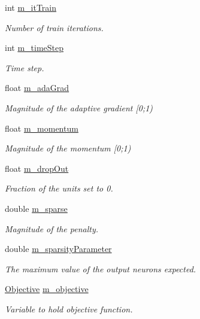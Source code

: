 \begin{DoxyCompactItemize}
int \hyperlink{classNeuralNetwork_a25ea37c7b768bf2ade89c55b9e159ee2}{m\+\_\+it\+Train}
\begin{DoxyCompactList}\small\item\em Number of train iterations. \end{DoxyCompactList}\item 
int \hyperlink{classNeuralNetwork_aea6b9756c3ef7e82b2d40414beb37984}{m\+\_\+time\+Step}
\begin{DoxyCompactList}\small\item\em Time step. \end{DoxyCompactList}\item 
float \hyperlink{classNeuralNetwork_a30141464584fc2cc51599ffec4ce8dd8}{m\+\_\+ada\+Grad}
\begin{DoxyCompactList}\small\item\em Magnitude of the adaptive gradient \mbox{[}0;1) \end{DoxyCompactList}\item 
float \hyperlink{classNeuralNetwork_a8940dc6859b38907717cfec54e0929b1}{m\+\_\+momentum}
\begin{DoxyCompactList}\small\item\em Magnitude of the momentum \mbox{[}0;1) \end{DoxyCompactList}\item 
float \hyperlink{classNeuralNetwork_a754d963a6f58aee1e253f64d266ab487}{m\+\_\+drop\+Out}
\begin{DoxyCompactList}\small\item\em Fraction of the units set to 0. \end{DoxyCompactList}\item 
double \hyperlink{classNeuralNetwork_a5ff4dd9b7b90474cce090c37d7127366}{m\+\_\+sparse}
\begin{DoxyCompactList}\small\item\em Magnitude of the penalty. \end{DoxyCompactList}\item 
double \hyperlink{classNeuralNetwork_ac6e586b8ab49ef7ca1f07dab6f197f6c}{m\+\_\+sparsity\+Parameter}
\begin{DoxyCompactList}\small\item\em The maximum value of the output neurons expected. \end{DoxyCompactList}\item 
\hyperlink{classObjective}{Objective} \hyperlink{classNeuralNetwork_a296fef6f667d2bcf1080a16c8c3aceb2}{m\+\_\+objective}
\begin{DoxyCompactList}\small\item\em Variable to hold objective function. \end{DoxyCompactList}\item 

\end{DoxyCompactItemize}
